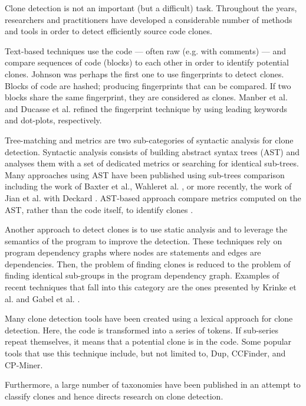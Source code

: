 \documentclass[conference]{IEEEtran}
\begin{document}
Clone detection is not an important (but a difficult) task. Throughout the years, researchers and practitioners have developed a considerable number of methods and tools in order to detect efficiently source code clones.

Text-based techniques use the code --- often raw (e.g. with comments) --- and compare sequences of code (blocks) to each other in order to identify potential clones. Johnson was perhaps the first one to use fingerprints to detect clones\cite{Johnson1993,Johnson1994}. Blocks of code are hashed; producing fingerprints that can be compared.
If two blocks share the same fingerprint, they are considered as clones.
Manber et al. \cite{Manber1994} and Ducasse et al.\cite{Ducasse1999} refined the fingerprint technique by using leading keywords and dot-plots, respectively.

Tree-matching and metrics are two sub-categories of syntactic analysis for clone detection. Syntactic analysis consists of building abstract syntax trees (AST) and analyses them with a set of dedicated metrics or searching for identical sub-trees. Many approaches using AST have been published using sub-trees comparison including the work of Baxter et al.\cite{Baxter1998}, Wahleret al. \cite{Wahler}, or more recently, the work of Jian et al. with Deckard \cite{Jiang2007}.
AST-based approach compare metrics computed on the AST, rather than the code itself, to identify clones \cite{Patenaude1999, Balazinska}.

Another approach to detect clones is to use static analysis and to leverage the semantics of the program to improve the detection.
These techniques rely on program dependency graphs where nodes are statements and edges are dependencies.
Then, the problem of finding clones is reduced to the problem of finding identical sub-groups in the program dependency graph.
Examples of recent techniques that fall into this category are the ones presented by Krinke et al.\cite{Krinke2001} and  Gabel et al. \cite{Gabel2008}.

Many clone detection tools have been created using a lexical approach for clone detection. Here, the code is transformed into a series of tokens. If sub-series repeat themselves, it means that a potential clone is in the code. Some popular tools that use this technique include, but not limited to, Dup\cite{Baker}, CCFinder\cite{Kamiya2002}, and CP-Miner\cite{Li2006}.

Furthermore, a large number of taxonomies have been published in an attempt to classify  clones and hence directs  research on clone detection\cite{Mayrand1996,Balazinska1999,Koschke2006,Bellon2007,NeilDavey,Kontogiannis,Kapser}.
\end{document}
